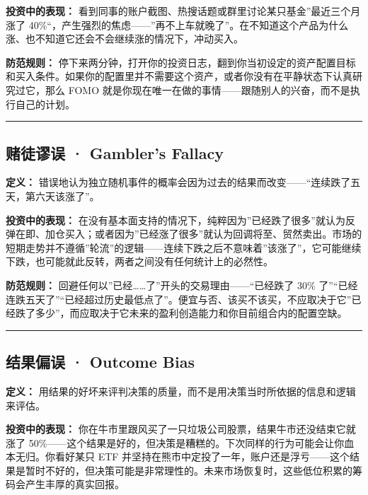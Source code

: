 \documentclass[a4paper,11pt,oneside,fontset=none,UTF8,zihao=-4]{ctexbook}
\begin{document}
\textbf{投资中的表现：}
看到同事的账户截图、热搜话题或群里讨论某只基金''最近三个月涨了
40\%``，产生强烈的焦虑------''再不上车就晚了''。在不知道这个产品为什么涨、也不知道它还会不会继续涨的情况下，冲动买入。

\textbf{防范规则：}
停下来两分钟，打开你的投资日志，翻到你当初设定的资产配置目标和买入条件。如果你的配置里并不需要这个资产，或者你没有在平静状态下认真研究过它，那么
FOMO
就是你现在唯一在做的事情------跟随别人的兴奋，而不是执行自己的计划。

\begin{center}{\color{dh-bronze}\rule{0.2\textwidth}{0.5pt}}\end{center}

\subsection{赌徒谬误 · Gambler's
Fallacy}\label{ux8d4cux5f92ux8c2cux8bef-gamblers-fallacy}

\textbf{定义：}
错误地认为独立随机事件的概率会因为过去的结果而改变------``连续跌了五天，第六天该涨了''。

\textbf{投资中的表现：}
在没有基本面支持的情况下，纯粹因为''已经跌了很多''就认为反弹在即、加仓买入；或者因为''已经涨了很多''就认为回调将至、贸然卖出。市场的短期走势并不遵循''轮流''的逻辑------连续下跌之后不意味着''该涨了''，它可能继续下跌，也可能就此反转，两者之间没有任何统计上的必然性。

\textbf{防范规则：}
回避任何以''已经\ldots\ldots 了''开头的交易理由------``已经跌了 30\%
了''``已经连跌五天了''``已经超过历史最低点了''。便宜与否、该买不该买，不应取决于它''已经跌了多少''，而应取决于它未来的盈利创造能力和你目前组合内的配置空缺。

\begin{center}{\color{dh-bronze}\rule{0.2\textwidth}{0.5pt}}\end{center}

\subsection{结果偏误 · Outcome
Bias}\label{ux7ed3ux679cux504fux8bef-outcome-bias}

\textbf{定义：}
用结果的好坏来评判决策的质量，而不是用决策当时所依据的信息和逻辑来评估。

\textbf{投资中的表现：}
你在牛市里跟风买了一只垃圾公司股票，结果牛市还没结束它就涨了
50\%------这个结果是好的，但决策是糟糕的。下次同样的行为可能会让你血本无归。你看好某只
ETF
并坚持在熊市中定投了一年，账户还是浮亏------这个结果是暂时不好的，但决策可能是非常理性的。未来市场恢复时，这些低位积累的筹码会产生丰厚的真实回报。
\end{document}
